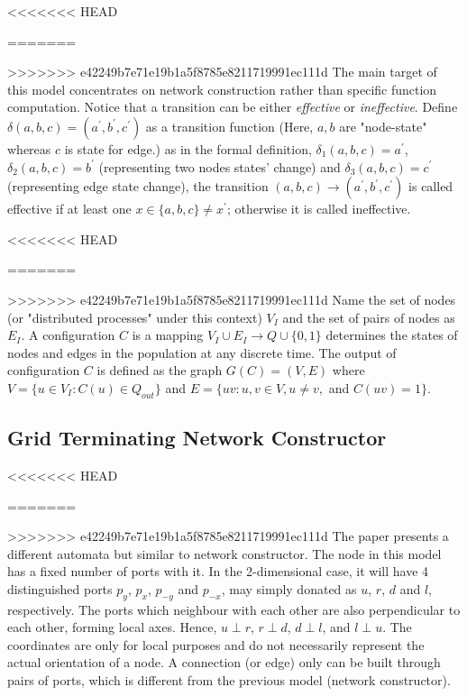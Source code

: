 <<<<<<< HEAD
\par\noindent
=======
\par
>>>>>>> e42249b7e71e19b1a5f8785e8211719991ec111d
The main target of this model concentrates on network construction rather than
specific function computation. Notice that a transition can be either \textit{effective}
or \textit{ineffective}. Define $\delta(a, b, c) = (a^{'}, b^{'},c^{'})$ as a transition function (Here, $a, b$ are "node-state" whereas $c$ is state for edge.)
as in the formal definition, $\delta_{1}(a,b,c) = a^{'}$, $\delta_{2}(a,b,c) = b^{'}$ (representing two nodes states' change)
and $\delta_{3}(a,b,c) = c^{'}$ (representing edge state change), the transition $(a,b,c) \to (a^{'}, b^{'},c^{'})$ is called
effective if at least one $x \in \{a,b,c\} \not= x^{'} $; otherwise it is called ineffective.

<<<<<<< HEAD
\par\noindent
=======
\par
>>>>>>> e42249b7e71e19b1a5f8785e8211719991ec111d
Name the set of nodes (or "distributed processes" under this context) $V_{I}$ and the set of pairs of nodes as $E_{I}$.
A configuration $C$ is a mapping $ V_{I} \cup E_{I} \to Q \cup \{0,1\} $ determines the states of nodes and edges in the population at any discrete time.
The output of configuration $C$ is defined as the graph $G(C) = (V, E) $ where $V = \{u \in V_{I}: C(u) \in Q_{out}\}$
and  $E = \{uv: u, v \in V, u \not= v,$ and $C(uv) = 1\}$.

\subsection{Grid Terminating Network Constructor \cite{Mi17} \label{IntroToGrid}}
<<<<<<< HEAD
\par\noindent
=======
\par
>>>>>>> e42249b7e71e19b1a5f8785e8211719991ec111d
The paper \cite{Mi17} presents a different automata but similar to network constructor. The node in this
model has a fixed number of ports with it. In the 2-dimensional case, it will have 4 distinguished ports
$p_{y}$, $p_{x}$, $p_{-y}$ and $p_{-x}$, may simply donated as $u$, $r$, $d$ and $l$, respectively.
The ports which neighbour with each other are also perpendicular to each other, forming local axes. Hence,
$ u \perp r $, $ r \perp d $, $ d \perp l $, and  $ l \perp u $. The coordinates are only for local purposes and
do not necessarily represent the actual orientation of a node. A connection (or edge) only can be built through
pairs of ports, which is different from the previous model (network constructor).

